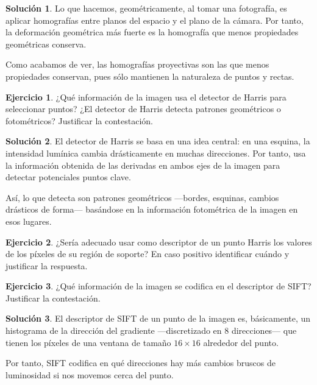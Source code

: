 \documentclass[a4paper, 11pt]{article}
\theoremstyle{definition}
\newtheorem{ejercicio}{Ejercicio}
\newtheorem*{solucion}{Solución}
\theoremstyle{theorem}
\begin{document}
  \begin{solucion}
      Lo que hacemos, geométricamente, al tomar una fotografía, es aplicar homografías entre planos del espacio y el plano de la cámara. Por tanto, la deformación geométrica más fuerte es la homografía que menos propiedades geométricas conserva.

      Como acabamos de ver, las homografías proyectivas son las que menos propiedades conservan, pues sólo mantienen la naturaleza de puntos y rectas.
  \end{solucion}

  \begin{ejercicio}
      ¿Qué información de la imagen usa el detector de Harris para seleccionar puntos? ¿El detector de Harris detecta patrones geométricos o fotométricos? Justificar la contestación.
  \end{ejercicio}

  \begin{solucion}
      El detector de Harris se basa en una idea central: en una esquina, la intensidad lumínica cambia drásticamente en muchas direcciones. Por tanto, usa la información obtenida de las derivadas en ambos ejes de la imagen para detectar potenciales puntos clave.

      Así, lo que detecta son patrones geométricos ---bordes, esquinas, cambios drásticos de forma--- basándose en la información fotométrica de la imagen en esos lugares.
  \end{solucion}

  \begin{ejercicio}
      ¿Sería adecuado usar como descriptor de un punto Harris los valores de los píxeles de su región de soporte? En caso positivo identificar cuándo y justificar la respuesta.
  \end{ejercicio}

  \begin{ejercicio}
      ¿Qué información de la imagen se codifica en el descriptor de SIFT? Justificar la contestación.
  \end{ejercicio}

  \begin{solucion}
      El descriptor de SIFT de un punto de la imagen es, básicamente, un histograma de la dirección del gradiente ---discretizado en 8 direcciones--- que tienen los píxeles de una ventana de tamaño $16\times16$ alrededor del punto.

      Por tanto, SIFT codifica en qué direcciones hay más cambios bruscos de luminosidad si nos movemos cerca del punto.
  \end{solucion}
\end{document}
